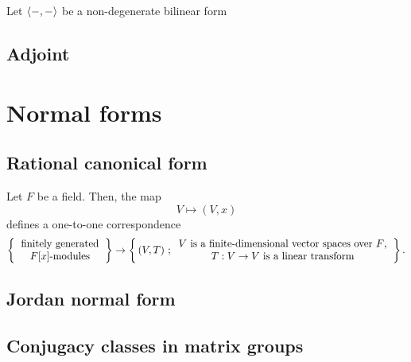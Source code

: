 \documentclass{../../large}
\begin{document}
\begin{prb}
Let $\langle-,-\rangle$ be a non-degenerate bilinear form
\end{prb}

\section{Adjoint}
\begin{prb}
\end{prb}







\chapter{Normal forms}
\section{Rational canonical form}
\begin{prb}
Let $F$ be a field.
Then, the map
\[V\mapsto(V,x)\]
defines a one-to-one correspondence
\[\left\{\begin{tabular}{c}finitely generated\\$F[x]$-modules\end{tabular}\right\}\to\left\{\,(V,T)\ ;\begin{tabular}{c}$V$ is a finite-dimensional vector spaces over $F$,\\$T:V\to V$ is a linear transform\end{tabular}\right\}.\]
\end{prb}
\begin{prb}
\end{prb}
\section{Jordan normal form}


\section{Conjugacy classes in matrix groups}
\end{document}
